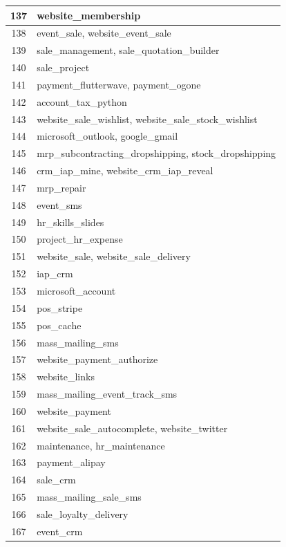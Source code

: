 \begin{small}
\begin{longtable}{|c|p{14cm}|}
137 & website{\_}membership \\ \hline
138 & event{\_}sale, website{\_}event{\_}sale \\ \hline
139 & sale{\_}management, sale{\_}quotation{\_}builder \\ \hline
140 & sale{\_}project \\ \hline
141 & payment{\_}flutterwave, payment{\_}ogone \\ \hline
142 & account{\_}tax{\_}python \\ \hline
143 & website{\_}sale{\_}wishlist, website{\_}sale{\_}stock{\_}wishlist \\ \hline
144 & microsoft{\_}outlook, google{\_}gmail \\ \hline
145 & mrp{\_}subcontracting{\_}dropshipping, stock{\_}dropshipping \\ \hline
146 & crm{\_}iap{\_}mine, website{\_}crm{\_}iap{\_}reveal \\ \hline
147 & mrp{\_}repair \\ \hline
148 & event{\_}sms \\ \hline
149 & hr{\_}skills{\_}slides \\ \hline
150 & project{\_}hr{\_}expense \\ \hline
151 & website{\_}sale, website{\_}sale{\_}delivery \\ \hline
152 & iap{\_}crm \\ \hline
153 & microsoft{\_}account \\ \hline
154 & pos{\_}stripe \\ \hline
155 & pos{\_}cache \\ \hline
156 & mass{\_}mailing{\_}sms \\ \hline
157 & website{\_}payment{\_}authorize \\ \hline
158 & website{\_}links \\ \hline
159 & mass{\_}mailing{\_}event{\_}track{\_}sms \\ \hline
160 & website{\_}payment \\ \hline
161 & website{\_}sale{\_}autocomplete, website{\_}twitter \\ \hline
162 & maintenance, hr{\_}maintenance \\ \hline
163 & payment{\_}alipay \\ \hline
164 & sale{\_}crm \\ \hline
165 & mass{\_}mailing{\_}sale{\_}sms \\ \hline
166 & sale{\_}loyalty{\_}delivery \\ \hline
167 & event{\_}crm \\ \hline

\end{longtable}
\end{small}

